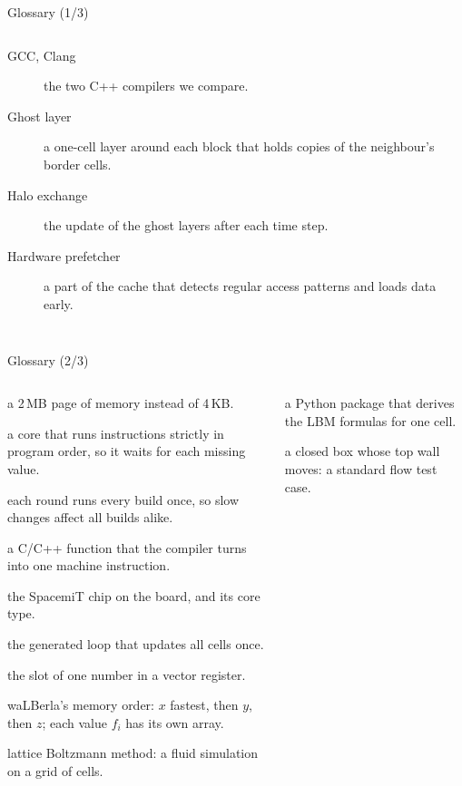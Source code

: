 \documentclass[aspectratio=169,10pt,t]{beamer}
\begin{document}
\begin{frame}{Glossary (1/3)}
\begin{columns}[T,onlytextwidth]
\begin{description}
      \item[GCC, Clang] the two C++ compilers we compare.
      \item[Ghost layer] a one-cell layer around each block that holds copies of the neighbour's border cells.
      \item[Halo exchange] the update of the ghost layers after each time step.
      \item[Hardware prefetcher] a part of the cache that detects regular access patterns and loads data early.
    \end{description}
  \end{columns}
\end{frame}

\begin{frame}{Glossary (2/3)}
  \begin{columns}[T,onlytextwidth]
    \scriptsize
    \begin{description}\setlength{\itemsep}{0.8pt}
      \item[Huge page] a 2\,MB page of memory instead of 4\,KB.
      \item[In order] a core that runs instructions strictly in program order, so it waits for each missing value.
      \item[Interleaved rounds] each round runs every build once, so slow changes affect all builds alike.
      \item[Intrinsic] a C/C++ function that the compiler turns into one machine instruction.
      \item[K1, X60] the SpacemiT chip on the board, and its core type.
      \item[Kernel] the generated loop that updates all cells once.
      \item[Lane] the slot of one number in a vector register.
      \item[Layout fzyx] waLBerla's memory order: $x$ fastest, then $y$, then $z$; each value $f_i$ has its own array.
      \item[LBM] lattice Boltzmann method: a fluid simulation on a grid of cells.
    \end{description}
    \scriptsize
    \begin{description}\setlength{\itemsep}{0.8pt}
      \item[lbmpy] a Python package that derives the LBM formulas for one cell.
      \item[Lid-driven cavity] a closed box whose top wall moves: a standard flow test case.

\end{description}
\end{columns}
\end{frame}
\end{document}
